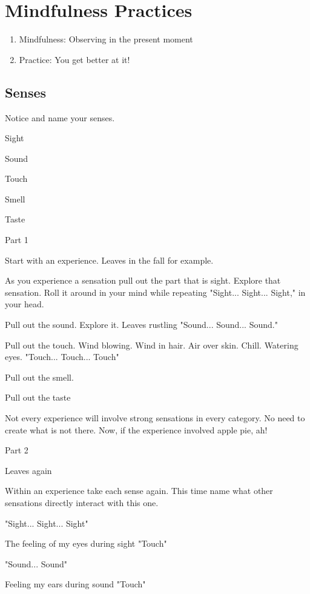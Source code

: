 \section{Mindfulness Practices}

\begin{enumerate}
	\item Mindfulness: Observing in the present moment
	\item Practice:  You get better at it!
\end{enumerate}

\subsection{Senses}

Notice and name your senses. 

Sight

Sound

Touch

Smell

Taste 

Part 1 

Start with an experience.  Leaves in the fall for example. 

As you experience a sensation pull out the part that is sight.  Explore that sensation.  Roll it around in your mind while repeating "Sight... Sight... Sight," in your head. 

Pull out the sound.  Explore it.  Leaves rustling "Sound... Sound... Sound." 

Pull out the touch.  Wind blowing.  Wind in hair.  Air over skin.  Chill.  Watering eyes.   "Touch... Touch... Touch" 

Pull out the smell.   

Pull out the taste 

Not every experience will involve strong sensations in every category.  No need to create what is not there.  Now, if the experience involved apple pie, ah! 

Part 2 

Leaves again 

Within an experience take each sense again.  This time name what other sensations directly interact with this one. 

"Sight... Sight... Sight"

The feeling of my eyes during sight "Touch" 

"Sound... Sound"

Feeling my ears during sound "Touch"

